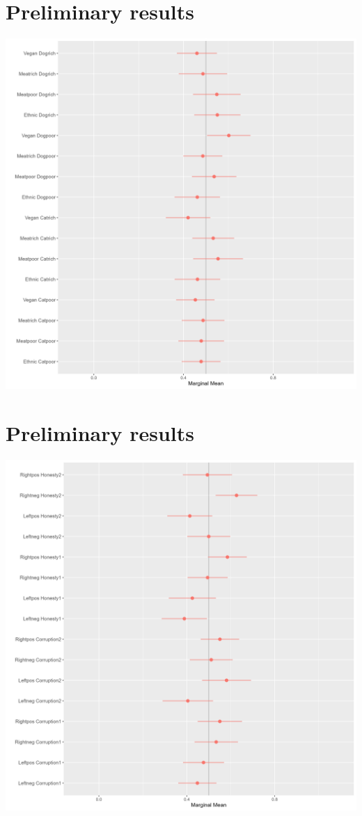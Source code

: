 \documentclass[
]{article}
\begin{document}
\section{Preliminary results}\label{preliminary-results-2}

\begin{center}\includegraphics[width=0.75\linewidth]{images/interaction2} \end{center}

\section{Preliminary results}\label{preliminary-results-3}

\begin{center}\includegraphics[width=0.75\linewidth]{images/interaction3} \end{center}
\end{document}
